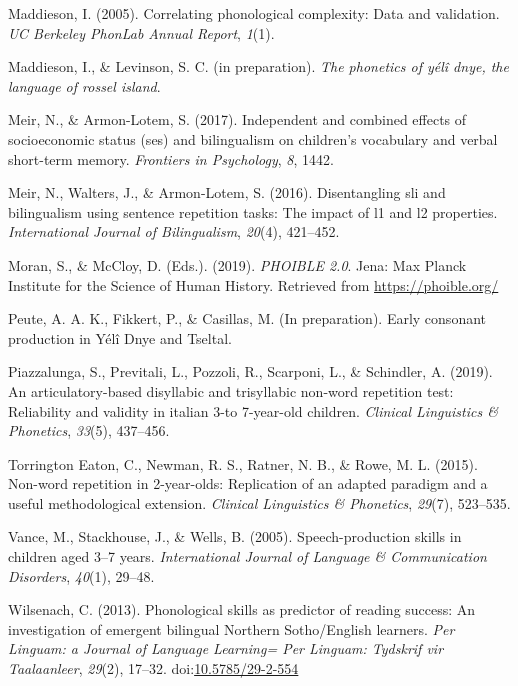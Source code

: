 \documentclass[english,,man,floatsintext]{apa6}
\begin{document}
\hypertarget{ref-maddieson2005correlating}{}
Maddieson, I. (2005). Correlating phonological complexity: Data and
validation. \emph{UC Berkeley PhonLab Annual Report}, \emph{1}(1).

\hypertarget{ref-maddiesonIPphoneticsYD}{}
Maddieson, I., \& Levinson, S. C. (in preparation). \emph{The phonetics
of yélî dnye, the language of rossel island}.

\hypertarget{ref-meir2017independent}{}
Meir, N., \& Armon-Lotem, S. (2017). Independent and combined effects of
socioeconomic status (ses) and bilingualism on children's vocabulary and
verbal short-term memory. \emph{Frontiers in Psychology}, \emph{8},
1442.

\hypertarget{ref-meir2016disentangling}{}
Meir, N., Walters, J., \& Armon-Lotem, S. (2016). Disentangling sli and
bilingualism using sentence repetition tasks: The impact of l1 and l2
properties. \emph{International Journal of Bilingualism}, \emph{20}(4),
421--452.

\hypertarget{ref-phoible}{}
Moran, S., \& McCloy, D. (Eds.). (2019). \emph{PHOIBLE 2.0}. Jena: Max
Planck Institute for the Science of Human History. Retrieved from
\url{https://phoible.org/}

\hypertarget{ref-peuteIPconsonants}{}
Peute, A. A. K., Fikkert, P., \& Casillas, M. (In preparation). Early
consonant production in Yélî Dnye and Tseltal.

\hypertarget{ref-piazzalunga2019articulatory}{}
Piazzalunga, S., Previtali, L., Pozzoli, R., Scarponi, L., \& Schindler,
A. (2019). An articulatory-based disyllabic and trisyllabic non-word
repetition test: Reliability and validity in italian 3-to 7-year-old
children. \emph{Clinical Linguistics \& Phonetics}, \emph{33}(5),
437--456.

\hypertarget{ref-torrington2015non}{}
Torrington Eaton, C., Newman, R. S., Ratner, N. B., \& Rowe, M. L.
(2015). Non-word repetition in 2-year-olds: Replication of an adapted
paradigm and a useful methodological extension. \emph{Clinical
Linguistics \& Phonetics}, \emph{29}(7), 523--535.

\hypertarget{ref-vance2005speech}{}
Vance, M., Stackhouse, J., \& Wells, B. (2005). Speech-production skills
in children aged 3--7 years. \emph{International Journal of Language \&
Communication Disorders}, \emph{40}(1), 29--48.

\hypertarget{ref-wilsenach2013phonological}{}
Wilsenach, C. (2013). Phonological skills as predictor of reading
success: An investigation of emergent bilingual Northern Sotho/English
learners. \emph{Per Linguam: a Journal of Language Learning= Per
Linguam: Tydskrif vir Taalaanleer}, \emph{29}(2), 17--32.
doi:\href{https://doi.org/10.5785/29-2-554}{10.5785/29-2-554}
\end{document}
